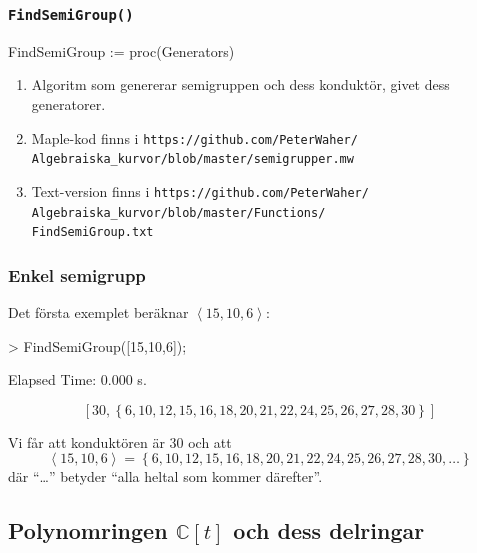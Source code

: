 \documentclass{beamer}
\begin{document}
\begin{frame}
	\frametitle{\texttt{FindSemiGroup()}}
	
	\begin{semiverbatim}
		FindSemiGroup := proc(Generators)
	\end{semiverbatim}
	
	\begin{enumerate}
		\item<1-> Algoritm som genererar semigruppen och dess konduktör, givet dess generatorer.

		\item<2-> Maple-kod finns i \texttt{https://github.com/PeterWaher/\\
			\qquad Algebraiska\_kurvor/blob/master/semigrupper.mw}
		
		\item<3-> Text-version finns i
		\texttt{https://github.com/PeterWaher/\\
			\qquad Algebraiska\_kurvor/blob/master/Functions/\\
			\qquad FindSemiGroup.txt} 
	\end{enumerate}
\end{frame}

\begin{frame}
	\frametitle{Enkel semigrupp}
	\begin{example}
		Det första exemplet beräknar $\left<15, 10, 6\right>$:

		\begin{semiverbatim}
			> FindSemiGroup([15,10,6]);
			
			
			Elapsed Time: 0.000 s.
		\end{semiverbatim}
		\[\left[30, \left\{6, 10, 12, 15, 16, 18, 20, 21, 22, 24, 25, 26, 27, 28, 30\right\}\right]\]

		
		Vi får att konduktören är $30$ och att 
		\[\left<15, 10, 6\right> = \left\{6, 10, 12, 15, 16, 18, 20, 21, 22, 24, 25, 26, 27, 28, 30, \ldots\right\}\]
		där ``\ldots'' betyder ``alla heltal som kommer därefter''.
	\end{example}
\end{frame}


\subsection{Polynomringen $\mathbb{C}[t]$ och dess delringar}
\end{document}
